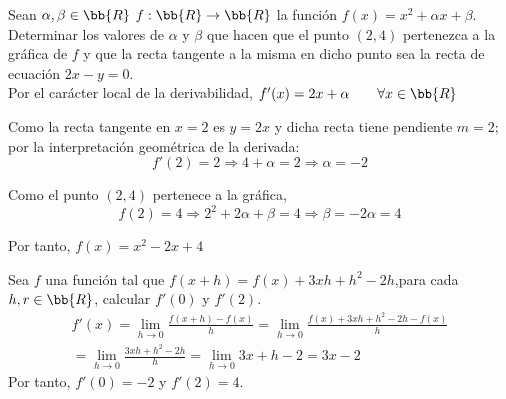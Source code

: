 \begin{ejercicio}
    Sean $\alpha, \beta \in \bb{R}$ $f:\bb{R} \to \bb{R}$ la función $f(x)=x^2+\alpha x + \beta$. Determinar los valores de $\alpha$ y $\beta$ que hacen que el punto $(2,4)$ pertenezca a la gráfica de $f$ y que la recta tangente a la misma en dicho punto sea la recta de ecuación $2x-y=0$.\\

    Por el carácter local de la derivabilidad, $f'(x) = 2x+\alpha \qquad \forall x \in \bb{R}$

    Como la recta tangente en $x=2$ es $y=2x$ y dicha recta tiene pendiente $m=2$; por la interpretación geométrica de la derivada:
    \begin{equation*}
        f'(2) = 2 \Longrightarrow 4+\alpha = 2 \Longrightarrow \alpha = -2
    \end{equation*}
    
    Como el punto $(2,4)$ pertenece a la gráfica,
    \begin{equation*}
        f(2)=4 \Longrightarrow 2^2 + 2\alpha + \beta = 4 \Longrightarrow \beta = -2\alpha = 4
    \end{equation*}

    Por tanto, $f(x) = x^2 -2x +4$
    
\end{ejercicio}

\begin{ejercicio}
    Sea $f$ una función tal que $f(x+h)=f(x)+3xh+h^2-2h$,\quad para cada $h,r \in \bb{R}$, calcular $f'(0)$ y $f'(2)$.
    \begin{multline*}
        f'(x) = \lim_{h\to 0} \frac{f(x+h)-f(x)}{h} = \lim_{h\to 0} \frac{f(x)+3xh+h^2-2h-f(x)}{h} \\ 
        = \lim_{h\to 0} \frac{3xh+h^2-2h}{h} = \lim_{h\to 0} 3x+h-2 = 3x-2
    \end{multline*}
    Por tanto, $f'(0) = -2$ y $f'(2) = 4$.
\end{ejercicio}

